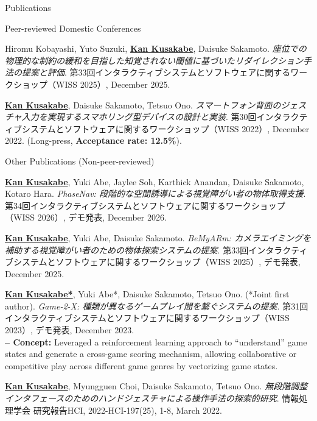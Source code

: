 \documentclass[
    11pt, %
]{resume} %
\begin{document}
\begin{rSection}{Publications}
\begin{rSubsection}{Peer-reviewed Domestic Conferences}{}{}{}
    \item Hiromu Kobayashi, Yuto Suzuki, \underline{\textbf{Kan Kusakabe}}, Daisuke Sakamoto.
    \textit{座位での物理的な制約の緩和を目指した知覚されない閾値に基づいたリダイレクション手法の提案と評価}.
    第33回インタラクティブシステムとソフトウェアに関するワークショップ（WISS 2025）, December 2025.
    \item \underline{\textbf{Kan Kusakabe}}, Daisuke Sakamoto, Tetsuo Ono.
    \textit{スマートフォン背面のジェスチャ入力を実現するスマホリング型デバイスの設計と実装}.
    第30回インタラクティブシステムとソフトウェアに関するワークショップ（WISS 2022）, December 2022. (Long-press, \textbf{Acceptance rate: 12.5\%}).
\end{rSubsection}

\begin{rSubsection}{Other Publications (Non-peer-reviewed)}{}{}{}
    \item \underline{\textbf{Kan Kusakabe}}, Yuki Abe, Jaylee Soh, Karthick Anandan, Daisuke Sakamoto, Kotaro Hara.
    \textit{PhaseNav: 段階的な空間誘導による視覚障がい者の物体取得支援}.
    第34回インタラクティブシステムとソフトウェアに関するワークショップ（WISS 2026）, デモ発表, December 2026.

    \item \underline{\textbf{Kan Kusakabe}}, Yuki Abe, Daisuke Sakamoto.
    \textit{BeMyARm: カメラエイミングを補助する視覚障がい者のための物体探索システムの提案}.
    第33回インタラクティブシステムとソフトウェアに関するワークショップ（WISS 2025）, デモ発表, December 2025.
    \item \underline{\textbf{Kan Kusakabe*}}, Yuki Abe*, Daisuke Sakamoto, Tetsuo Ono. (*Joint first author).
    \textit{Game-2-X: 種類が異なるゲームプレイ間を繋ぐシステムの提案}.
    第31回インタラクティブシステムとソフトウェアに関するワークショップ（WISS 2023）, デモ発表, December 2023.\\
    \textbf{-- Concept:} Leveraged a reinforcement learning approach to “understand” game states and generate a cross-game scoring mechanism, allowing collaborative or competitive play across different game genres by vectorizing game states.\\

    \item \underline{\textbf{Kan Kusakabe}}, Myungguen Choi, Daisuke Sakamoto, Tetsuo Ono.
    \textit{無段階調整インタフェースのためのハンドジェスチャによる操作手法の探索的研究}. 情報処理学会 研究報告HCI, 2022-HCI-197(25), 1-8, March 2022.\\
\end{rSubsection}


\end{rSection}
\end{document}
